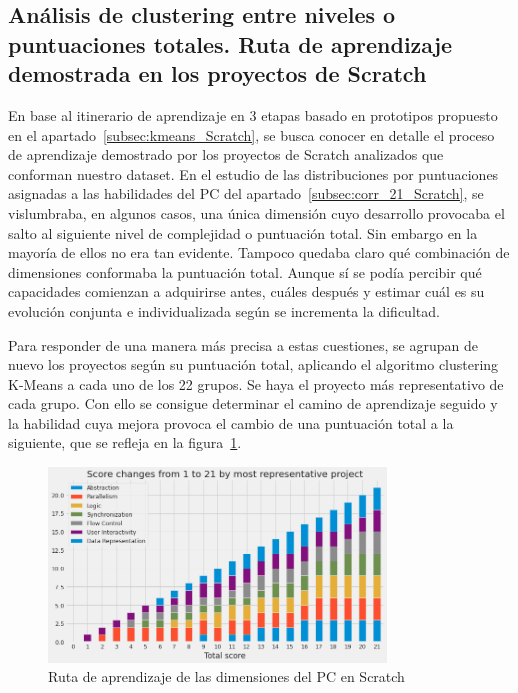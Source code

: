 \documentclass[a4paper, 12pt]{book}
\begin{document}
\subsection{Análisis de clustering entre niveles o puntuaciones totales. Ruta de aprendizaje demostrada en los proyectos de Scratch}
\label{subsec:ruta_Scratch}

En base al itinerario de aprendizaje en 3 etapas basado en prototipos propuesto en el apartado~\ref{subsec:kmeans_Scratch}, se  busca conocer en detalle el proceso de aprendizaje demostrado por los proyectos de Scratch analizados que conforman nuestro dataset. 
En el estudio de las distribuciones por puntuaciones asignadas a las habilidades del PC del apartado~\ref{subsec:corr_21_Scratch}, se vislumbraba, en algunos casos, una única dimensión cuyo desarrollo provocaba el salto al siguiente nivel de complejidad o puntuación total. Sin embargo en la mayoría de ellos no era tan evidente. Tampoco quedaba claro qué combinación de dimensiones conformaba la puntuación total. 
Aunque sí se podía percibir qué capacidades comienzan a adquirirse antes, cuáles después y estimar cuál es su evolución conjunta e individualizada según se incrementa la dificultad.

Para responder de una manera más precisa a estas cuestiones, se agrupan de nuevo los proyectos según su puntuación total, aplicando el algoritmo clustering K-Means a cada uno de los 22 grupos. Se haya el proyecto más representativo de cada grupo. 
Con ello se consigue determinar el camino de aprendizaje seguido y la habilidad cuya mejora provoca el cambio de una puntuación total a la siguiente, que se refleja en la figura~\ref{fig:path_Scratch}.


\begin{figure}[H]
    \centering
    \includegraphics[width=0.8\textwidth]{img/path_CT_Scratch1.png}
    \caption{Ruta de aprendizaje de las dimensiones del PC en Scratch}\label{fig:path_Scratch}
\end{figure}
\end{document}
